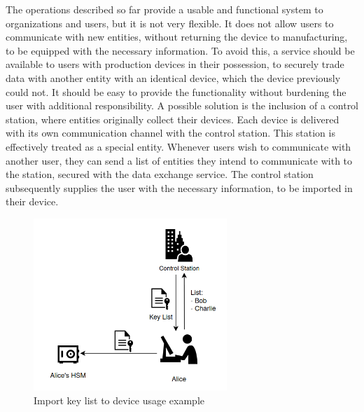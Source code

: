 The operations described so far provide a usable and functional system to organizations and users, but it is not very flexible. It does not allow users to communicate with new entities, without returning the device to manufacturing, to be equipped with the necessary information.
To avoid this, a service should be available to users with production devices in their possession, to securely trade data with another entity with an identical device, which the device previously could not. It should be easy to provide the functionality without burdening the user with additional responsibility.
A possible solution is the inclusion of a control station, where entities originally collect their devices. Each device is delivered with its own communication channel with the control station. This station is effectively treated as a special entity.
Whenever users wish to communicate with another user, they can send a list of entities they intend to communicate with to the station, secured with the data exchange service. The control station subsequently supplies the user with the necessary information, to be imported in their device.

\begin{figure}[h]
    \centering
    \includegraphics[width=0.65\textwidth]{./Images/user-import-service.png}
    \caption{Import key list to device usage example}
    \label{fig:user:import-service}
\end{figure}

